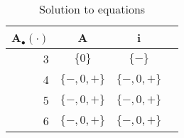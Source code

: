 \begin{table}
\begin{tabular}{| r | c | c | c |}
\hline
A$_\bullet (\cdot) $ & A   & i \\
\hline
3         & $\{0\} $    & $\{-\}$ \\
4         & $\{-,0,+\}$ & $\{-,0,+\}$ \\
5         & $\{-,0,+\}$ & $\{-,0,+\}$ \\
6         & $\{-,0,+\}$ & $\{-,0,+\}$ \\
\hline
\end{tabular}
\centering
\caption{Solution to equations}
\label{tabel:signs_example_equations_solution}
\end{table}